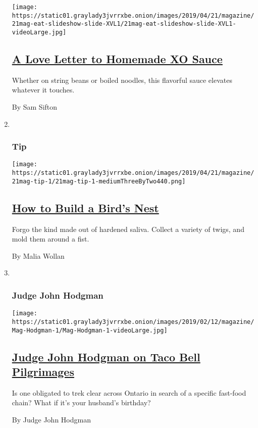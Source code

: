 \begin{enumerate}
  \texttt{[image: https://static01.graylady3jvrrxbe.onion/images/2019/04/21/magazine/21mag-eat-slideshow-slide-XVL1/21mag-eat-slideshow-slide-XVL1-videoLarge.jpg]}

  \hypertarget{a-love-letter-to-homemade-xo-sauce}{%
  \subsection{\texorpdfstring{\href{/2019/04/17/magazine/xo-sauce-recipe.html}{A
  Love Letter to Homemade XO
  Sauce}}{A Love Letter to Homemade XO Sauce}}\label{a-love-letter-to-homemade-xo-sauce}}

  Whether on string beans or boiled noodles, this flavorful sauce
  elevates whatever it touches.

  By Sam Sifton
\item ~
  \hypertarget{tip}{%
  \subsubsection{Tip}\label{tip}}

  \texttt{[image: https://static01.graylady3jvrrxbe.onion/images/2019/04/21/magazine/21mag-tip-1/21mag-tip-1-mediumThreeByTwo440.png]}

  \hypertarget{how-to-build-a-birds-nest}{%
  \subsection{\texorpdfstring{\href{/2019/04/16/magazine/how-to-build-a-birds-nest.html}{How
  to Build a Bird's
  Nest}}{How to Build a Bird's Nest}}\label{how-to-build-a-birds-nest}}

  Forgo the kind made out of hardened saliva. Collect a variety of
  twigs, and mold them around a fist.

  By Malia Wollan
\item ~
  \hypertarget{judge-john-hodgman}{%
  \subsubsection{Judge John Hodgman}\label{judge-john-hodgman}}

  \texttt{[image: https://static01.graylady3jvrrxbe.onion/images/2019/02/12/magazine/Mag-Hodgman-1/Mag-Hodgman-1-videoLarge.jpg]}

  \hypertarget{judge-john-hodgman-on-taco-bell-pilgrimages}{%
  \subsection{\texorpdfstring{\href{/2019/04/18/magazine/judge-john-hodgman-on-taco-bell-pilgrimages.html}{Judge
  John Hodgman on Taco Bell
  Pilgrimages}}{Judge John Hodgman on Taco Bell Pilgrimages}}\label{judge-john-hodgman-on-taco-bell-pilgrimages}}

  Is one obligated to trek clear across Ontario in search of a specific
  fast-food chain? What if it's your husband's birthday?

  By Judge John Hodgman
\end{enumerate}

